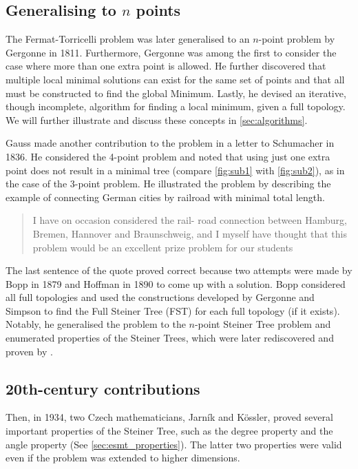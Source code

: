 \documentclass{l4proj}
\begin{document}
\subsection{Generalising to $n$ points}
\label{sec:gergonne}
The Fermat-Torricelli problem was later generalised to an $n$-point problem by Gergonne in 1811. Furthermore, Gergonne was among the first to consider the case where more than one extra point is allowed. He further discovered that multiple local minimal solutions can exist for the same set of points and that all must be constructed to find the global Minimum. Lastly, he devised an iterative, though incomplete, algorithm for finding a local minimum, given a full topology. We will further illustrate and discuss these concepts in \ref{sec:algorithms}.

Gauss made another contribution to the problem in a letter to Schumacher in 1836. He considered the 4-point problem and noted that using just one extra point does not result in a minimal tree (compare \ref{fig:sub1} with \ref{fig:sub2}), as in the case of the 3-point problem. He illustrated the problem by describing the example of connecting German cities by railroad with minimal total length.
\begin{quote}
    I have on occasion considered the rail- road connection between Hamburg, Bremen, Hannover and Braunschweig, and I myself have thought that this problem would be an excellent prize problem for our students
\end{quote}

The last sentence of the quote proved correct because two attempts were made by Bopp in 1879 and Hoffman in 1890 to come up with a solution. Bopp considered all full topologies and used the constructions developed by Gergonne and Simpson to find the Full Steiner Tree (FST) for each full topology (if it exists). Notably, he generalised the problem to the $n$-point Steiner Tree problem and enumerated properties of the Steiner Trees, which were later rediscovered and proven by \cite{Gilbert1968SteinerMT}.

\subsection{20th-century contributions}
Then, in 1934, two Czech mathematicians, Jarník and Kössler, proved several important properties of the Steiner Tree, such as the degree property and the angle property (See \ref{sec:esmt_properties}). The latter two properties were valid even if the problem was extended to higher dimensions.
\end{document}
